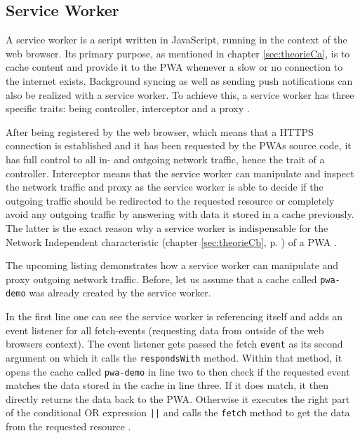 \subsection{Service Worker}
\label{sec:theorieCc}

A service worker is a script written in JavaScript, running in the context of the web browser. Its primary purpose, as mentioned in chapter \ref{sec:theorieCa}, is to cache content and provide it to the  \acs{PWA} whenever a slow or no connection to the internet exists. Background syncing as well as sending push notifications can also be realized with a service worker. To achieve this, a service worker has three specific traits: being controller, interceptor and a proxy \cite[p. 176]{liebelProgressiveWebApps2019}.

After being registered by the web browser, which means that a HTTPS connection is established and it has been requested by the  \acs{PWA}s source code, it has full control to all in- and outgoing network traffic, hence the trait of a controller. Interceptor means that the service worker can manipulate and inspect the network traffic and proxy as the service worker is able to decide if the outgoing traffic should be redirected to the requested resource or completely avoid any outgoing traffic by answering with data it stored in a cache previously. The latter is the exact reason why a service worker is indispensable for the Network Independent characteristic (chapter \ref{sec:theorieCb}, p. \pageref{sec:theorieCb}) of a  \acs{PWA} \cite[p. 176-177]{liebelProgressiveWebApps2019}.

The upcoming listing demonstrates how a service worker can manipulate and proxy outgoing network traffic. Before, let us assume that a cache called \texttt{pwa-demo} was already created by the service worker.

\begin{center}
	\begin{minipage}{\textwidth}
		
	\end{minipage}
\end{center}

In the first line one can see the service worker is referencing itself and adds an event listener for all fetch-events (requesting data from outside of the web browsers context). The event listener gets passed the fetch \texttt{event} as its second argument on which it calls the \texttt{respondsWith} method. Within that method, it opens the cache called \texttt{pwa-demo} in line two to then check if the requested event matches the data stored in the cache in line three. If it does match, it then directly returns the data back to the  \acs{PWA}. Otherwise it executes the right part of the conditional OR expression \texttt{||} and calls the \texttt{fetch} method to get the data from the requested resource \cite[p. 60]{liebelProgressiveWebApps2019}.

